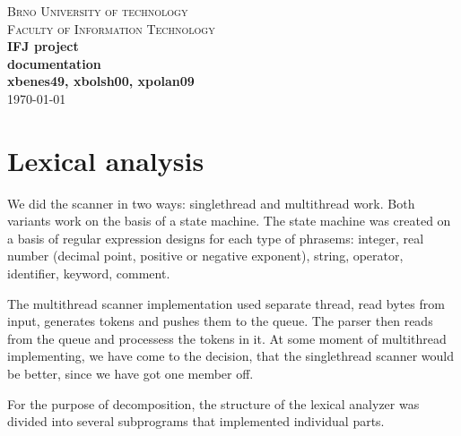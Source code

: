 \documentclass[12pt,a4paper,titlepage]{article}
\begin{document}
\begin{titlepage}

\begin{center}
\textsc{\LARGE Brno University of technology}\\[0.5cm]
\textsc{\large Faculty of Information Technology}\\[7cm]

{ \huge \bfseries IFJ project}\\[0.3cm]
{ \Large \bfseries documentation}\\[0.4cm]
{\bfseries xbenes49, xbolsh00, xpolan09}\\[12cm]

\today
\end{center}

\end{titlepage}
\newpage


\tableofcontents  %
\thispagestyle{empty}
\newpage



\setcounter{page}{1}

\section{Lexical analysis}

\begin{justify}
We did the scanner in two ways: singlethread and multithread work. Both variants work on the basis of a state machine.
The state machine was created on a basis of regular expression designs for each type of phrasems:
integer, real number (decimal point, positive or negative exponent), string, operator, identifier, keyword, comment.

The multithread scanner implementation used separate thread, read bytes from input, generates tokens and pushes
them to the queue. The parser then reads from the queue and processess the tokens in it. At some moment of multithread
implementing, we have come to the decision, that the singlethread scanner would be better, since we have got one member off.

For the purpose of decomposition, the structure of the lexical analyzer was divided into several subprograms
that implemented individual parts.
\end{justify}
\end{document}
